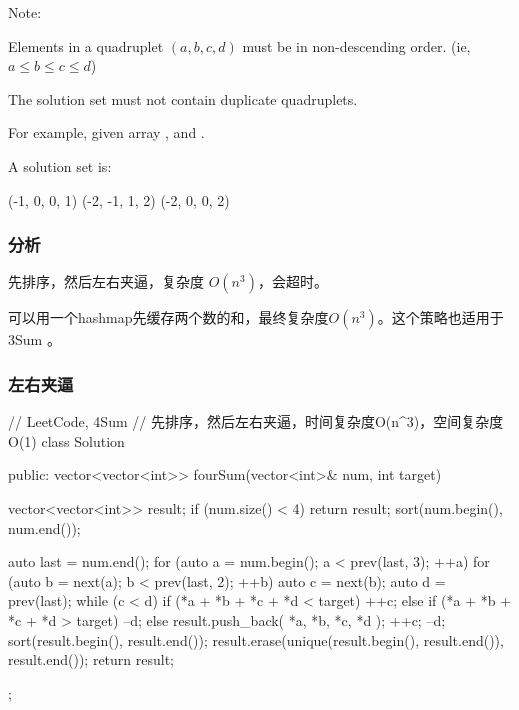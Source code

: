 Note:
\begindot
\item Elements in a quadruplet $(a,b,c,d)$ must be in non-descending order. (ie, $a \leq b \leq c \leq d$)
\item The solution set must not contain duplicate quadruplets.
\myenddot

For example, given array , and . 

A solution set is:
\begin{Code}
(-1,  0, 0, 1)
(-2, -1, 1, 2)
(-2,  0, 0, 2)
\end{Code}


\subsubsection{分析}
先排序，然后左右夹逼，复杂度 $O(n^3)$，会超时。

可以用一个hashmap先缓存两个数的和，最终复杂度$O(n^3)$。这个策略也适用于 3Sum 。


\subsubsection{左右夹逼}
\begin{Code}
// LeetCode, 4Sum
// 先排序，然后左右夹逼，时间复杂度O(n^3)，空间复杂度O(1)
class Solution {
public:
    vector<vector<int>> fourSum(vector<int>& num, int target) {
        vector<vector<int>> result;
        if (num.size() < 4) return result;
        sort(num.begin(), num.end());

        auto last = num.end();
        for (auto a = num.begin(); a < prev(last, 3); ++a) {
            for (auto b = next(a); b < prev(last, 2); ++b) {
                auto c = next(b);
                auto d = prev(last);
                while (c < d) {
                    if (*a + *b + *c + *d < target) {
                        ++c;
                    } else if (*a + *b + *c + *d > target) {
                        --d;
                    } else {
                        result.push_back({ *a, *b, *c, *d });
                        ++c;
                        --d;
                    }
                }
            }
        }
        sort(result.begin(), result.end());
        result.erase(unique(result.begin(), result.end()), result.end());
        return result;
    }
};
\end{Code}


